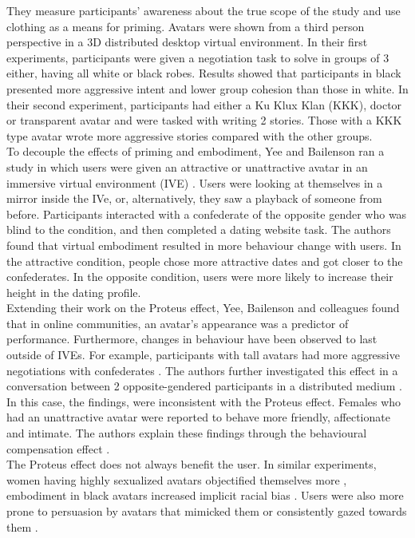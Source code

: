 They measure participants' awareness about the true scope of the study and use clothing as a means for priming. Avatars were shown from a third person perspective in a 3D distributed desktop virtual environment. In their first experiments, participants were given a negotiation task to solve in groups of 3 either, having all white or black robes. Results showed that participants in black presented more aggressive intent and lower group cohesion than those in white. In their second experiment, participants had either a Ku Klux Klan (KKK), doctor or transparent avatar and were tasked with writing 2 stories. Those with a KKK type avatar wrote more aggressive stories compared with the other groups.\\
To decouple the effects of priming and embodiment, Yee and Bailenson ran a study in which users were given an attractive or unattractive avatar in an immersive virtual environment (IVE) \cite{yee2009difference}. Users were looking at themselves in a mirror inside the IVe, or, alternatively, they saw a playback of someone from before. Participants interacted with a confederate of the opposite gender who was blind to the condition, and then completed a dating website task.
The authors found that virtual embodiment resulted in more behaviour change with users. In the attractive condition, people chose more attractive dates and got closer to the confederates. In the opposite condition, users were more likely to increase their height in the dating profile.\\
Extending their work on the Proteus effect, Yee, Bailenson and colleagues found that in online communities, an avatar’s appearance was a predictor of performance. 
Furthermore, changes in behaviour have been observed to last outside of IVEs. For example, participants with tall avatars had more aggressive negotiations with confederates \cite{yee2009proteus}. The authors further  investigated this effect in a conversation between 2 opposite-gendered participants in a distributed medium \cite{van2013proteus}. In this case, the findings, were inconsistent with the Proteus effect. Females who had an unattractive avatar were reported to behave more friendly, affectionate and intimate. The authors explain these findings through the behavioural compensation effect \cite{bond1972effect}.\\
The Proteus effect does not always benefit the user. In similar experiments, women having highly sexualized avatars objectified themselves more \cite{fox2013embodiment}, embodiment in black avatars increased implicit racial bias \cite{groom2009influence}. Users were also more prone to persuasion by avatars that mimicked them \cite{bailenson2006transformed} or consistently gazed towards them \cite{bailenson2005digital}. 
